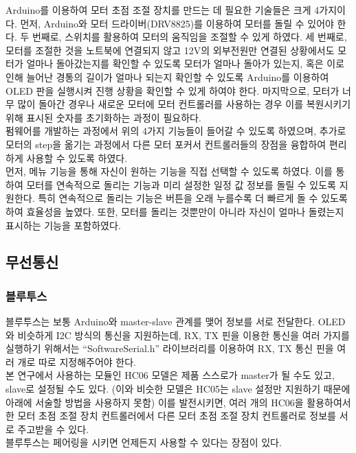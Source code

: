 Arduino를 이용하여 모터 초점 조절 장치를 만드는 데 필요한 기술들은 크게 4가지이다. 먼저, Arduino와 모터 드라이버(DRV8825)를 이용하여 모터를 돌릴 수 있어야 한다. 두 번째로, 스위치를 활용하여 모터의 움직임을 조절할 수 있게 하였다. 세 번째로, 모터를 조절한 것을 노트북에 연결되지 않고 12V의 외부전원만 연결된 상황에서도 모터가 얼마나 돌아갔는지를 확인할 수 있도록 모터가 얼마나 돌아가 있는지, 혹은 이로 인해 늘어난 경통의 길이가 얼마나 되는지 확인할 수 있도록 Arduino를 이용하여 OLED 판을 실행시켜 진행 상황을 확인할 수 있게 하여야 한다. 마지막으로, 모터가 너무 많이 돌아간 경우나 새로운 모터에 모터 컨트롤러를 사용하는 경우 이를 복원시키기 위해 표시된 숫자를 초기화하는 과정이 필요하다.\\
펌웨어를 개발하는 과정에서 위의 4가지 기능들이 들어갈 수 있도록 하였으며, 추가로 모터의 step을 옮기는 과정에서 다른 모터 포커서 컨트롤러들의 장점을 융합하여 편리하게 사용할 수 있도록 하였다.\\
먼저, 메뉴 기능을 통해 자신이 원하는 기능을 직접 선택할 수 있도록 하였다. 이를 통하여 모터를 연속적으로 돌리는 기능과 미리 설정한 일정 값 정보를 돌릴 수 있도록 지원한다. 특히 연속적으로 돌리는 기능은 버튼을 오래 누를수록 더 빠르게 돌 수 있도록 하여 효율성을 높였다. 또한, 모터를 돌리는 것뿐만이 아니라 자신이 얼마나 돌렸는지 표시하는 기능을 포함하였다.

\subsection{무선통신}

\subsubsection{블루투스}

블루투스는 보통 Arduino와 master-slave 관계를 맺어 정보를 서로 전달한다. OLED와 비슷하게 I2C 방식의 통신을 지원하는데, RX, TX 핀을 이용한 통신을 여러 가지를 실행하기 위해서는 “SoftwareSerial.h” 라이브러리를 이용하여 RX, TX 통신 핀을 여러 개로 따로 지정해주어야 한다.\\
본 연구에서 사용하는 모듈인 HC06 모델은 제품 스스로가 master가 될 수도 있고, slave로 설정될 수도 있다. (이와 비슷한 모델은 HC05는 slave 설정만 지원하기 때문에 아래에 서술할 방법을 사용하지 못함) 이를 발전시키면, 여러 개의 HC06을 활용하여서 한 모터 초점 조절 장치 컨트롤러에서 다른 모터 초점 조절 장치 컨트롤러로 정보를 서로 주고받을 수 있다.\\
블루투스는 페어링을 시키면 언제든지 사용할 수 있다는 장점이 있다.

